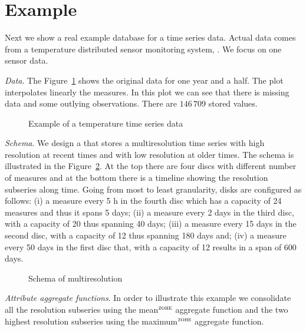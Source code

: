 \section{Example}
\label{sec:example}


Next we show a real example database for a time series data. Actual
data comes from a temperature distributed sensor monitoring system,
\cite{alippi10}. We focus on one sensor data.

\emph{Data}. The Figure~\ref{fig:exemple:original} shows the original
data for one year and a half. The plot interpolates linearly the
measures. In this plot we can see that there is missing data and some
outlying observations. There are $146\,709$ stored values.

\begin{figure}[tp]
  \centering
  
  \caption{Example of a temperature time series data}
  \label{fig:exemple:original}
\end{figure}

\emph{Schema}. We design a  that stores a multiresolution
time series with high resolution at recent times and with low
resolution at older times. The schema is illustrated in the
Figure~\ref{fig:exemple:window}. At the top there are four discs with
different number of measures and at the bottom there is a timeline
showing the resolution subseries along time. Going from most to least
granularity, disks are configured as follows: (i) a measure every 5 h
in the fourth disc which has a capacity of 24 measures and thus it
spans 5 days; (ii) a measure every 2 days in the third disc, with a
capacity of 20 thus spanning 40 days; (iii) a measure every 15 days in
the second disc, with a capacity of 12 thus spanning 180 days and;
(iv) a measure every 50 days in the first disc that, with a capacity
of 12 results in a span of 600 days.

\begin{figure}[tp]
  \centering
  \setlength{\unitlength}{1.3mm}
  
  \caption{Schema of multiresolution}
  \label{fig:exemple:window}
\end{figure}

\emph{Attribute aggregate functions}.  In order to illustrate this
example we consolidate all the resolution subseries using the
mean$^\zohe{}$ aggregate function and the two highest resolution
subseries using the maximum$^\zohe{}$ aggregate function. 



